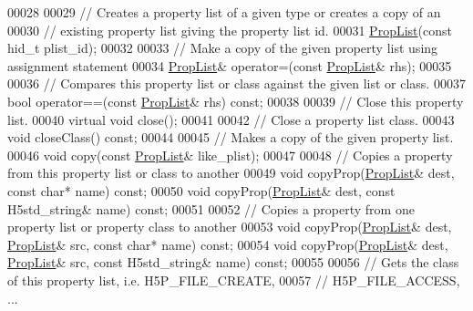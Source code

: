 \begin{DoxyCode}
00028 
00029         \textcolor{comment}{// Creates a property list of a given type or creates a copy of an}
00030         \textcolor{comment}{// existing property list giving the property list id.}
00031         \hyperlink{class_h5_1_1_prop_list}{PropList}(\textcolor{keyword}{const} hid\_t plist\_id);
00032 
00033         \textcolor{comment}{// Make a copy of the given property list using assignment statement}
00034         \hyperlink{class_h5_1_1_prop_list}{PropList}& operator=(\textcolor{keyword}{const} \hyperlink{class_h5_1_1_prop_list}{PropList}& rhs);
00035 
00036         \textcolor{comment}{// Compares this property list or class against the given list or class.}
00037         \textcolor{keywordtype}{bool} operator==(\textcolor{keyword}{const} \hyperlink{class_h5_1_1_prop_list}{PropList}& rhs) \textcolor{keyword}{const};
00038 
00039         \textcolor{comment}{// Close this property list.}
00040         \textcolor{keyword}{virtual} \textcolor{keywordtype}{void} close();
00041 
00042         \textcolor{comment}{// Close a property list class.}
00043         \textcolor{keywordtype}{void} closeClass() \textcolor{keyword}{const};
00044 
00045         \textcolor{comment}{// Makes a copy of the given property list.}
00046         \textcolor{keywordtype}{void} copy(\textcolor{keyword}{const} \hyperlink{class_h5_1_1_prop_list}{PropList}& like\_plist);
00047 
00048         \textcolor{comment}{// Copies a property from this property list or class to another}
00049         \textcolor{keywordtype}{void} copyProp(\hyperlink{class_h5_1_1_prop_list}{PropList}& dest, \textcolor{keyword}{const} \textcolor{keywordtype}{char}* name) \textcolor{keyword}{const};
00050         \textcolor{keywordtype}{void} copyProp(\hyperlink{class_h5_1_1_prop_list}{PropList}& dest, \textcolor{keyword}{const} H5std\_string& name) \textcolor{keyword}{const};
00051 
00052         \textcolor{comment}{// Copies a property from one property list or property class to another}
00053         \textcolor{keywordtype}{void} copyProp(\hyperlink{class_h5_1_1_prop_list}{PropList}& dest, \hyperlink{class_h5_1_1_prop_list}{PropList}& src, \textcolor{keyword}{const} \textcolor{keywordtype}{char}* name) \textcolor{keyword}{const};
00054         \textcolor{keywordtype}{void} copyProp(\hyperlink{class_h5_1_1_prop_list}{PropList}& dest, \hyperlink{class_h5_1_1_prop_list}{PropList}& src, \textcolor{keyword}{const} H5std\_string& name) \textcolor{keyword}{const};
00055 
00056         \textcolor{comment}{// Gets the class of this property list, i.e. H5P\_FILE\_CREATE,}
00057         \textcolor{comment}{// H5P\_FILE\_ACCESS, ...}

\end{DoxyCode}
